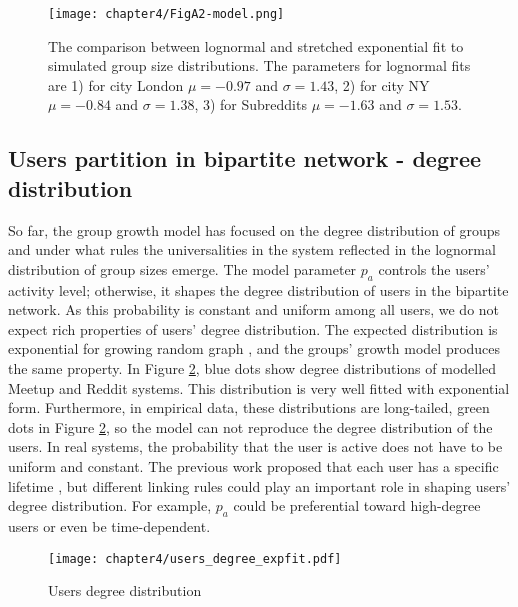 \clearpage
\newpage
\begin{figure}[H]
	\centering
	\texttt{[image: chapter4/FigA2-model.png]}
	\caption[The fitting of simulated group size distributions.]{The comparison between lognormal and stretched exponential fit to simulated group size distributions. The parameters for lognormal fits are 1) for city London $\mu=-0.97$ and $\sigma = 1.43$, 2) for city NY $\mu=-0.84$ and $\sigma = 1.38$, 3) for Subreddits $\mu=-1.63$ and $\sigma = 1.53$. }
	\label{fig:fit_model}
\end{figure}


\subsection{Users partition in bipartite network - degree distribution}

So far, the group growth model has focused on the degree distribution of groups and under what rules the universalities in the system reflected in the lognormal distribution of group sizes emerge. The model parameter $p_a$ controls the users' activity level; otherwise, it shapes the degree distribution of users in the bipartite network. As this probability is constant and uniform among all users, we do not expect rich properties of users' degree distribution. The expected distribution is exponential for growing random graph \cite{barabasi1999mean}, and the groups' growth model produces the same property. In Figure \ref{fig:users_degree}, blue dots show degree distributions of modelled Meetup and Reddit systems. This distribution is very well fitted with exponential form.
Furthermore, in empirical data, these distributions are long-tailed, green dots in Figure \ref{fig:users_degree}, so the model can not reproduce the degree distribution of the users. In real systems, the probability that the user is active does not have to be uniform and constant. The previous work proposed that each user has a specific lifetime \cite{leskovec2008microscopic}, but different linking rules could play an important role in shaping users' degree distribution. For example, $p_a$ could be preferential toward high-degree users or even be time-dependent.

\begin{figure}[h]
	\centering
	\texttt{[image: chapter4/users\_degree\_expfit.pdf]}
	\caption[Users degree distribution]{Users degree distribution}
	\label{fig:users_degree}
\end{figure}

